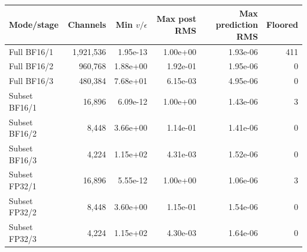 \begin{tabular}{lrrrrr}
\toprule
Mode/stage & Channels & Min $v/\epsilon$ & Max post RMS & Max prediction RMS & Floored \\
\midrule
Full BF16/1 & 1,921,536 & 1.95e-13 & 1.00e+00 & 1.93e-06 & 411 \\
Full BF16/2 & 960,768 & 1.88e+00 & 1.92e-01 & 1.95e-06 & 0 \\
Full BF16/3 & 480,384 & 7.68e+01 & 6.15e-03 & 4.95e-06 & 0 \\
Subset BF16/1 & 16,896 & 6.09e-12 & 1.00e+00 & 1.43e-06 & 3 \\
Subset BF16/2 & 8,448 & 3.66e+00 & 1.14e-01 & 1.41e-06 & 0 \\
Subset BF16/3 & 4,224 & 1.15e+02 & 4.31e-03 & 1.52e-06 & 0 \\
Subset FP32/1 & 16,896 & 5.55e-12 & 1.00e+00 & 1.06e-06 & 3 \\
Subset FP32/2 & 8,448 & 3.60e+00 & 1.15e-01 & 1.54e-06 & 0 \\
Subset FP32/3 & 4,224 & 1.15e+02 & 4.30e-03 & 1.64e-06 & 0 \\
\bottomrule
\end{tabular}

